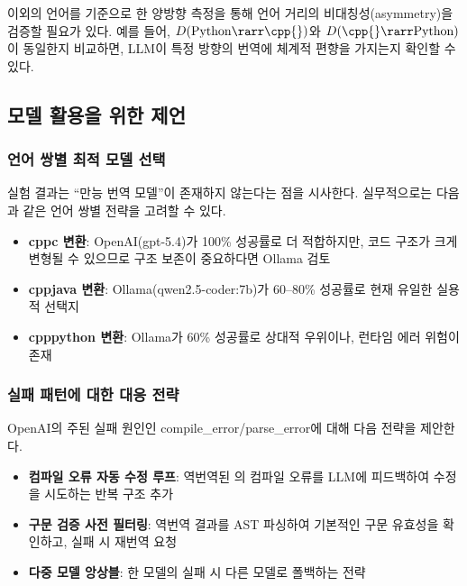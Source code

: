 \cpp{} 이외의 언어를 기준으로 한 양방향 측정을 통해 언어 거리의
비대칭성(asymmetry)을 검증할 필요가 있다.
예를 들어, $D(\text{Python} \rarr \text{\cpp{}})$와
$D(\text{\cpp{}} \rarr \text{Python})$이 동일한지 비교하면,
LLM이 특정 방향의 번역에 체계적 편향을 가지는지 확인할 수 있다.

\subsection{모델 활용을 위한 제언}\label{ssec:rec-model}

\subsubsection{언어 쌍별 최적 모델 선택}\label{sssec:model-selection}

실험 결과는 ``만능 번역 모델''이 존재하지 않는다는 점을 시사한다.
실무적으로는 다음과 같은 언어 쌍별 전략을 고려할 수 있다.

\begin{itemize}[leftmargin=2em]
  \item \textbf{\textsf{cpp\rarr{}c} 변환}: OpenAI(gpt-5.4)가 100\% 성공률로
    더 적합하지만, 코드 구조가 크게 변형될 수 있으므로 구조 보존이 중요하다면
    Ollama 검토
  \item \textbf{\textsf{cpp\rarr{}java} 변환}: Ollama(qwen2.5-coder:7b)가
    60--80\% 성공률로 현재 유일한 실용적 선택지
  \item \textbf{\textsf{cpp\rarr{}python} 변환}: Ollama가 60\% 성공률로
    상대적 우위이나, 런타임 에러 위험이 존재
\end{itemize}

\subsubsection{실패 패턴에 대한 대응 전략}\label{sssec:failure-strategy}

OpenAI의 주된 실패 원인인 compile\_error/parse\_error에 대해 다음 전략을 제안한다.

\begin{itemize}[leftmargin=2em]
  \item \textbf{컴파일 오류 자동 수정 루프}: 역번역된 \cpp{}의 컴파일 오류를
    LLM에 피드백하여 수정을 시도하는 반복 구조 추가
  \item \textbf{구문 검증 사전 필터링}: 역번역 결과를 AST 파싱하여 기본적인
    구문 유효성을 확인하고, 실패 시 재번역 요청
  \item \textbf{다중 모델 앙상블}: 한 모델의 실패 시 다른 모델로 폴백하는 전략
\end{itemize}

